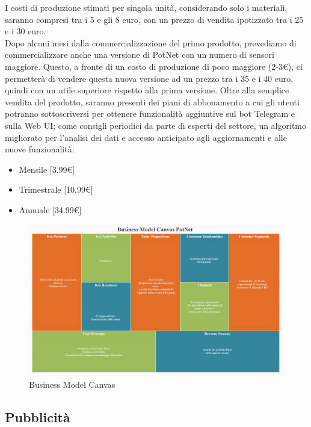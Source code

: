 I costi di produzione stimati per singola unità, considerando solo i materiali, saranno compresi tra i 5 e gli 8 euro, con un prezzo di vendita ipotizzato tra i 25 e i 30 euro. \\Dopo alcuni mesi dalla commercializzazione del primo prodotto, prevediamo di commercializzare anche una versione di PotNet con un numero di sensori maggiore. Questo, a fronte di un costo di produzione di poco maggiore (2-3€), ci permetterà di vendere questa nuova versione ad un prezzo tra i 35 e i 40 euro, quindi con un utile superiore rispetto alla prima versione.
\newline\newline Oltre alla semplice vendita del prodotto, saranno presenti dei piani di abbonamento a cui gli utenti potranno sottoscriversi per ottenere funzionalità aggiuntive sul bot Telegram e sulla Web UI; come consigli periodici da parte di esperti del settore, un algoritmo migliorato per l'analisi dei dati e accesso anticipato agli aggiornamenti e alle nuove funzionalità:
\begin{itemize}
	\item Mensile [3.99€]
	\item Trimestrale [10.99€]
	\item Annuale [34.99€]
\end{itemize}

\begin{figure}[ht!]
	\centering
	\includegraphics[width=\textwidth]{./images/Business-Model-Canvas.PNG} 
	\caption{Business Model Canvas \label{overflow}}
\end{figure}

\subsection{Pubblicità}

